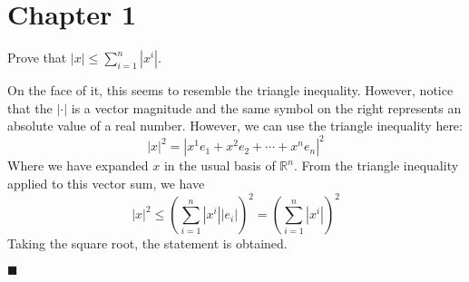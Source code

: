\documentclass[12pt]{article}
\renewcommand{\qed}{\hfill$\blacksquare$}
\renewenvironment{proof}{\begin{addmargin}[1em]{0em}\begin{newproof}}{\end{newproof}\end{addmargin}\qed}
\newenvironment{problem}[2][Problem]{\begin{trivlist}
\item[\hskip \labelsep {\bfseries #1}\hskip \labelsep {\bfseries #2.}]}{\end{trivlist}}
\begin{document}
 

\rhead{\today}
 


\section*{Chapter 1}


\begin{problem}{1-1} Prove that $\left|x\right| \leq \sum_{i=1}^n \left| x^i\right|$.
\end{problem}

\begin{proof}
On the face of it, this seems to resemble the triangle inequality. However, notice that the $\left| \cdot \right|$ is a vector magnitude and the same symbol on the right represents an absolute value of a real number. However, we can use the triangle inequality here:
\begin{equation*}
\left| x \right|^2  = \left| x^1 e_1 + x^2 e_2 + \cdots + x^n e_n \right|^2
\end{equation*}
Where we have expanded $x$ in the usual basis of $\mathbb{R}^n$. From the triangle inequality applied to this vector sum, we have
\begin{equation*}
\left|x\right|^2 \leq \left(\sum_{i=1}^n \left|x^i\right| \left| e_i \right| \right)^2 = \left(\sum_{i=1}^n \left|x^i \right|\right)^2
\end{equation*}
Taking the square root, the statement is obtained.
\end{proof}
\end{document}
